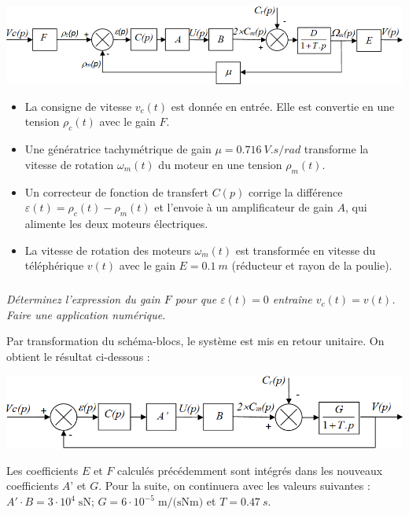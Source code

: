 \documentclass[10pt,fleqn]{article} %
\begin{document}
\begin{multicols}{2}
\begin{center}
	\includegraphics[width=\linewidth]{images2/fig_04}
\end{center}

\begin{itemize}
\item La consigne de vitesse $v_c(t)$ est donnée en entrée. Elle est convertie en une tension $\rho_c(t)$ avec le gain $F$.
\item Une génératrice tachymétrique de gain $\mu=\SI{0.716}{V.s/rad}$ transforme la vitesse de rotation $\omega_m(t)$ du moteur en une tension $\rho_m(t)$.
\item Un correcteur de fonction de transfert $C(p)$ corrige la différence $\varepsilon(t)=\rho_c(t)- \rho_m(t)$ et l’envoie à un amplificateur de gain $A$, qui alimente les deux moteurs électriques.
\item La vitesse de rotation des moteurs $\omega_m(t)$ est transformée en vitesse du téléphérique $v(t)$ avec le gain $E=\SI{0,1}{m}$ (réducteur et rayon de la poulie).
\end{itemize}


\subparagraph{}
\textit{Déterminez l’expression du gain $F$ pour que $\varepsilon(t)=0$ entraîne $v_c(t)=v(t)$. Faire une application numérique.}

\columnbreak
Par transformation du schéma-blocs, le système est mis en retour unitaire. On obtient le résultat ci-dessous :
\begin{center}
	\includegraphics[width=\linewidth]{images2/fig_05}
\end{center}

	Les coefficients $E$ et $F$ calculés précédemment sont intégrés dans les nouveaux coefficients $A’$ et $G$. Pour la suite, on continuera avec les valeurs suivantes : $A'\cdot B=3\cdot 10^{4}\;\text{sN}$; $G=6\cdot 10^{-5}\;\text{m/(sNm)}$ et $T=\SI{0,47}{s}$.
	

\end{multicols}
\end{document}
